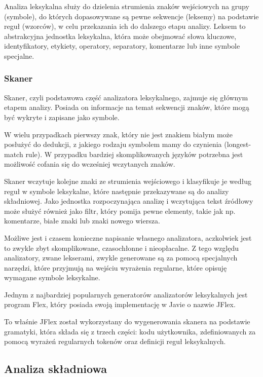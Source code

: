 \documentclass[a4paper,12pt]{article}
\begin{document}
Analiza leksykalna służy do dzielenia strumienia znaków wejściowych na grupy (symbole), do których dopasowywane są pewne sekwencje (leksemy) na podstawie reguł (wzorców), w celu przekazania ich do dalszego etapu analizy. Leksem to abstrakcyjna jednostka leksykalna, która może obejmować słowa kluczowe, identyfikatory, etykiety, operatory, separatory, komentarze lub inne symbole specjalne.

\subsubsection{Skaner}

Skaner, czyli podstawowa część analizatora leksykalnego, zajmuje się głównym etapem analizy. Posiada on informacje na temat sekwencji znaków, które mogą być wykryte i zapisane jako symbole.

W wielu przypadkach pierwszy znak, który nie jest znakiem białym może posłużyć do dedukcji, z jakiego rodzaju symbolem mamy do czynienia (longest-match rule). W przypadku bardziej skomplikowanych języków potrzebna jest możliwość cofania się do wcześniej wczytanych znaków.

Skaner wczytuje kolejne znaki ze strumienia wejściowego i klasyfikuje je według reguł w symbole leksykalne, które następnie przekazywane są do analizy składniowej. Jako jednostka rozpoczynająca analizę i wczytująca tekst źródłowy może służyć również jako filtr, który pomija pewne elementy, takie jak np. komentarze, białe znaki lub znaki nowego wiersza.

Możliwe jest i czasem konieczne napisanie własnego analizatora, aczkolwiek jest to zwykle zbyt skomplikowane, czasochłonne i nieopłacalne. Z tego względu analizatory, zwane lekserami, zwykle generowane są za pomocą specjalnych narzędzi, które przyjmują na wejściu wyrażenia regularne, które opisuję wymagane symbole leksykalne.

Jednym z najbardziej popularnych generatorów analizatorów leksykalnych jest program Flex\cite{flex}, który posiada swoją implementację w Javie o nazwie JFlex\cite{jflex}.

To właśnie JFlex został wykorzystany do wygenerowania skanera na podstawie gramatyki, która składa się z trzech części: kodu użytkownika, zdefiniowanych za pomocą wyrażeń regularnych tokenów oraz definicji reguł leksykalnych.

\subsection{Analiza składniowa}
\end{document}
